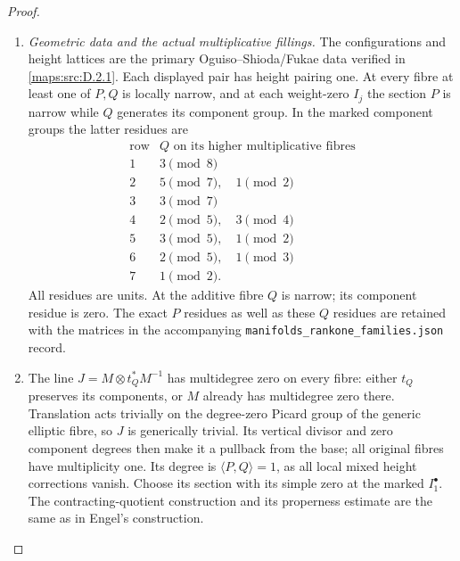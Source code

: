 \begin{proof}
\begin{enumerate}[label=\arabic*.,leftmargin=*]
\item \emph{Geometric data and the actual multiplicative fillings.}
The configurations and height lattices are the primary
Oguiso--Shioda/Fukae data verified in \ref{maps:src:D.2.1}. Each displayed
pair has height pairing one. At every fibre at least one of
$P,Q$ is locally narrow, and at each weight-zero $I_j$ the
section $P$ is narrow while $Q$ generates its component group.
In the marked component groups the latter residues are
\[
 \begin{array}{c|l}
 \text{row}&Q\text{ on its higher multiplicative fibres}\\\hline
 1&3\pmod8\\
 2&5\pmod7,\quad1\pmod2\\
 3&3\pmod7\\
 4&2\pmod5,\quad3\pmod4\\
 5&3\pmod5,\quad1\pmod2\\
 6&2\pmod5,\quad1\pmod3\\
 7&1\pmod2.
 \end{array}
\]
All residues are units. At the additive fibre $Q$ is narrow;
its component residue is zero. The exact $P$ residues as well
as these $Q$ residues are retained with the matrices in the
accompanying \texttt{manifolds\_rankone\_families.json} record.

\item The line $J=M\otimes t_Q^*M^{-1}$ has multidegree zero on
every fibre: either $t_Q$ preserves its components, or $M$
already has multidegree zero there. Translation acts trivially on the degree-zero Picard group of
the generic elliptic fibre, so $J$ is generically trivial. Its
vertical divisor and zero component degrees then make it a
pullback from the base; all original fibres have multiplicity one.
Its degree is $\langle P,Q\rangle=1$, as all local mixed
height corrections vanish. Choose its section with its simple
zero at the marked $I_1^\bullet$. The contracting-quotient
construction and its properness estimate are the same as in
Engel's construction.


\end{enumerate}
\end{proof}
